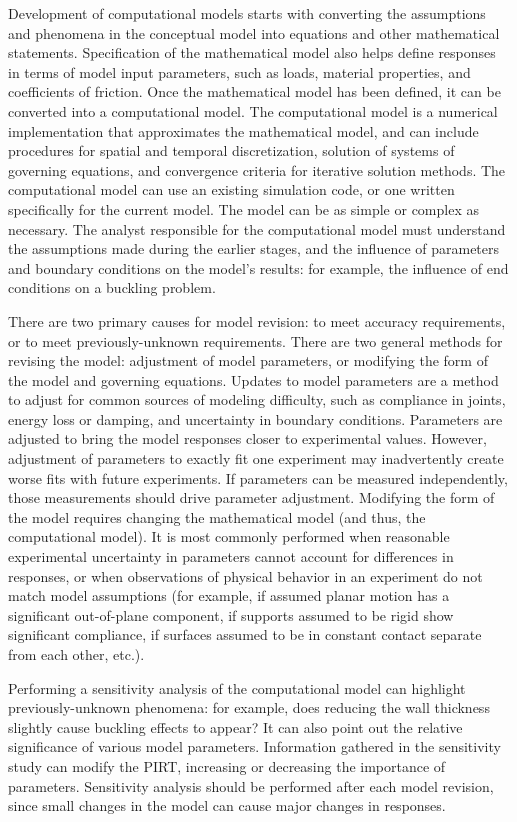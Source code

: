Development of computational models starts with converting the assumptions and phenomena in the conceptual model into equations and other mathematical statements.
Specification of the mathematical model also helps define responses in terms of model input parameters, such as loads, material properties, and coefficients of friction.
Once the mathematical model has been defined, it can be converted into a computational model.
The computational model is a numerical implementation that approximates the mathematical model, and can include procedures for spatial and temporal discretization, solution of systems of governing equations, and convergence criteria for iterative solution methods.
The computational model can use an existing simulation code, or one written specifically for the current model.
The model can be as simple or complex as necessary.
The analyst responsible for the computational model must understand the assumptions made during the earlier stages, and the influence of parameters and boundary conditions on the model's results: for example, the influence of end conditions on a buckling problem.

There are two primary causes for model revision: to meet accuracy requirements, or to meet previously-unknown requirements.
There are two general methods for revising the model: adjustment of model parameters, or modifying the form of the model and governing equations.
Updates to model parameters are a method to adjust for common sources of modeling difficulty, such as compliance in joints, energy loss or damping, and uncertainty in boundary conditions.
Parameters are adjusted to bring the model responses closer to experimental values.
However, adjustment of parameters to exactly fit one experiment may inadvertently create worse fits with future experiments.
If parameters can be measured independently, those measurements should drive parameter adjustment.
Modifying the form of the model requires changing the mathematical model (and thus, the computational model).
It is most commonly performed when reasonable experimental uncertainty in parameters cannot account for differences in responses, or when observations of physical behavior in an experiment do not match model assumptions (for example, if assumed planar motion has a significant out-of-plane component, if supports assumed to be rigid show significant compliance, if surfaces assumed to be in constant contact separate from each other, etc.).

Performing a sensitivity analysis of the computational model can highlight previously-unknown phenomena: for example, does reducing the wall thickness slightly cause buckling effects to appear?
It can also point out the relative significance of various model parameters.
Information gathered in the sensitivity study can modify the PIRT, increasing or decreasing the importance of parameters.
Sensitivity analysis should be performed after each model revision, since small changes in the model can cause major changes in responses.

